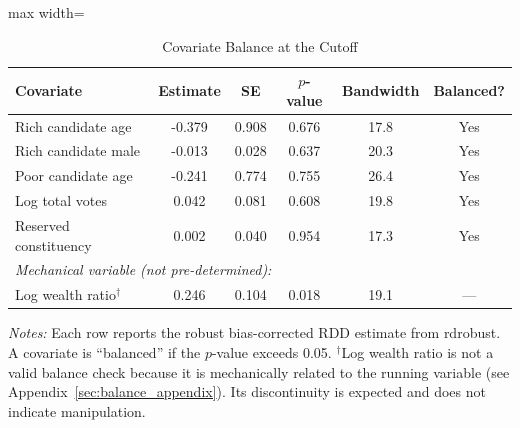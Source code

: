 \begin{table}[htbp]
\centering
\caption{Covariate Balance at the Cutoff}
\label{tab:balance}
\begin{adjustbox}{max width=\textwidth}
\begin{tabular}{lccccc}
\hline\hline
Covariate & Estimate & SE & $p$-value & Bandwidth & Balanced? \\
\hline
Rich candidate age & -0.379 & 0.908 & 0.676 & 17.8 & Yes \\
Rich candidate male & -0.013 & 0.028 & 0.637 & 20.3 & Yes \\
Poor candidate age & -0.241 & 0.774 & 0.755 & 26.4 & Yes \\
Log total votes & 0.042 & 0.081 & 0.608 & 19.8 & Yes \\
Reserved constituency & 0.002 & 0.040 & 0.954 & 17.3 & Yes \\
\hline
\multicolumn{6}{l}{\textit{Mechanical variable (not pre-determined):}} \\
Log wealth ratio$^\dagger$ & 0.246 & 0.104 & 0.018 & 19.1 & --- \\
\hline\hline
\end{tabular}
\end{adjustbox}
\begin{minipage}{0.95\textwidth}
\footnotesize
\textit{Notes:} Each row reports the robust bias-corrected RDD estimate from rdrobust. A covariate is ``balanced'' if the $p$-value exceeds 0.05. $^\dagger$Log wealth ratio is not a valid balance check because it is mechanically related to the running variable (see Appendix~\ref{sec:balance_appendix}). Its discontinuity is expected and does not indicate manipulation.
\end{minipage}
\end{table}
